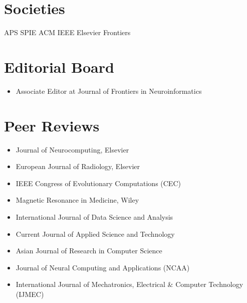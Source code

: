\documentclass[]{template}
\begin{document}
\sectionsep
\hline
\sectionsep

\section{Societies} 

APS \textbullet{}  SPIE \textbullet{} ACM \textbullet{} IEEE \textbullet{} Elsevier \textbullet{} Frontiers



\sectionsep
\hline
\sectionsep

\section{Editorial Board} 
\begin{itemize}
\item Associate Editor at Journal of Frontiers in Neuroinformatics
\end{itemize}

\section{Peer Reviews}
\begin{itemize}
\item Journal of Neurocomputing, Elsevier
\item European Journal of Radiology, Elsevier
\item IEEE Congress of Evolutionary Computations (CEC)
\item Magnetic Resonance in Medicine, Wiley
\item International Journal of Data Science and Analysis
\item Current Journal of Applied Science and Technology
\item Asian Journal of Research in Computer Science
\item Journal of Neural Computing and Applications (NCAA)
\item International Journal of Mechatronics, Electrical \& Computer Technology (IJMEC)
\end{itemize}
\end{document}
